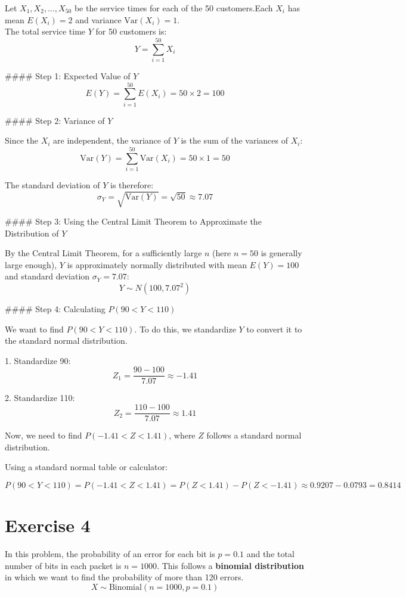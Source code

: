 \documentclass[a4paper,12pt]{article}
\begin{document}
Let \( X_1, X_2, \ldots, X_{50} \) be the service times for each of the 50 customers.Each \( X_i \) has mean \( E(X_i) = 2 \) and variance \( \text{Var}(X_i) = 1 \).
\\The total service time \( Y \) for 50 customers is:
  \[
  Y = \sum_{i=1}^{50} X_i
  \]

#### Step 1: Expected Value of \( Y \)
\[
E(Y) = \sum_{i=1}^{50} E(X_i) = 50 \times 2 = 100
\]

#### Step 2: Variance of \( Y \)

Since the \( X_i \) are independent, the variance of \( Y \) is the sum of the variances of \( X_i \):
\[
\text{Var}(Y) = \sum_{i=1}^{50} \text{Var}(X_i) = 50 \times 1 = 50
\]

The standard deviation of \( Y \) is therefore:
\[
\sigma_Y = \sqrt{\text{Var}(Y)} = \sqrt{50} \approx 7.07
\]

#### Step 3: Using the Central Limit Theorem to Approximate the Distribution of \( Y \)

By the Central Limit Theorem, for a sufficiently large \( n \) (here \( n = 50 \) is generally large enough), \( Y \) is approximately normally distributed with mean \( E(Y) = 100 \) and standard deviation \( \sigma_Y = 7.07 \):
\[
Y \sim N(100, 7.07^2)
\]

#### Step 4: Calculating \( P(90 < Y < 110) \)

We want to find \( P(90 < Y < 110) \). To do this, we standardize \( Y \) to convert it to the standard normal distribution.

1. Standardize 90:
   \[
   Z_1 = \frac{90 - 100}{7.07} \approx -1.41
   \]

2. Standardize 110:
   \[
   Z_2 = \frac{110 - 100}{7.07} \approx 1.41
   \]

Now, we need to find \( P(-1.41 < Z < 1.41) \), where \( Z \) follows a standard normal distribution.

Using a standard normal table or calculator:

\[
    P(90 < Y < 110) = P(-1.41 < Z < 1.41) = P(Z < 1.41) - P(Z < -1.41) \approx 0.9207 - 0.0793 = 0.8414
\]

\newpage
\section{Exercise 4}
In this problem, the probability of an error for each bit is \( p = 0.1 \) and the total number of bits in each packet is \( n = 1000 \). This follows a \textbf{binomial distribution} in which we want to find the probability of more than 120 errors.
\[
X \sim \text{Binomial}(n = 1000, p = 0.1)
\]
\end{document}
